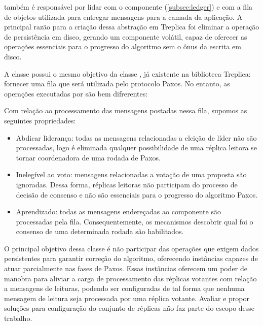  também é responsável por lidar com o componente
 (\autoref{subsec:ledger}) e com a fila de objetos utilizada
para entregar mensagens para a camada da aplicação. A principal razão para a criação dessa
abstração em Treplica foi eliminar a operação de persistência em disco, gerando um
componente volátil, capaz de oferecer as operações essenciais para o progresso do
algoritmo sem o ônus da escrita em disco.


A classe  possui o mesmo objetivo da classe
, já existente na biblioteca Treplica: fornecer uma fila
que será utilizada pelo protocolo Paxos. No entanto, as operações executadas por
 são bem difrerentes:

Com relação ao processamento das mensagens postadas nessa fila, supomos as seguintes
propriedades:

\begin{itemize}
  \item Abdicar liderança: todas as mensagens relacionadas a eleição de líder não são
    processadas, logo é eliminada qualquer possibilidade de uma réplica leitora se tornar
    coordenadora de uma rodada de Paxos.
  \item Inelegível ao voto: mensagens relacionadas a votação de uma proposta são
    ignoradas. Dessa forma, réplicas leitoras não participam do processo de decisão de
    consenso e não são essenciais para o progresso do algoritmo Paxos.
  \item Aprendizado: todas as mensagens endereçadas ao componente  são
    processadas pela fila. Consequentemente, os mecanismos descobrir qual foi o consenso
    de uma determinada rodada são habilitados.
\end{itemize}

O principal objetivo dessa classe é não participar das operações que exigem dados
persistentes para garantir correção do algoritmo, oferecendo instâncias capazes de atuar
parcialmente nas fases de Paxos. Essas instâncias oferecem um poder de manobra para
aliviar a carga de processamento das réplicas votantes com relação a mensagens de
leituras, podendo ser configuradas de tal forma que nenhuma mensagem de leitura seja
processada por uma réplica votante. Avaliar e propor soluções para configuração do
conjunto de réplicas não faz parte do escopo desse trabalho.

